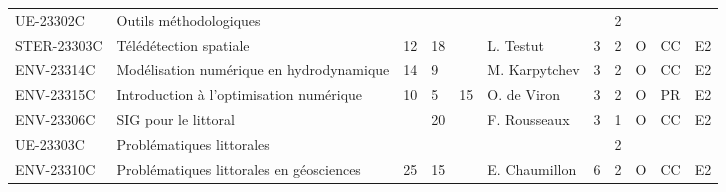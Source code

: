 \documentclass[a4paper,11pt]{article}
\begin{document}
{{\begin{tabular}{lllllllllll}
\rowcolor[HTML]{C0C0C0} 
UE-23302C                      & Outils méthodologiques                        &                           &                           &                           &                                    &                             & 2                           &                                    &                                  &                                  \\
STER-23303C                    & Télédétection spatiale                        & 12                        & 18                        &                           & L. Testut                          & 3                           & 2                           & O                                  & CC                               & E2                               \\
ENV-23314C                     & Modélisation numérique en hydrodynamique      & 14                        & 9                         &                           & M. Karpytchev                      & 3                           & 2                           & O                                  & CC                               & E2                               \\
ENV-23315C                     & Introduction à l'optimisation numérique       & 10                        & 5                         & 15                        & O. de Viron                        & 3                           & 2                           & O                                  & PR                               & E2                               \\
ENV-23306C                     & SIG pour le littoral                          &                           & 20                        &                           & F. Rousseaux                       & 3                           & 1                           & O                                  & CC                               & E2                               \\
\rowcolor[HTML]{C0C0C0} 
UE-23303C                      & Problématiques littorales                     &                           &                           &                           &                                    &                             & 2                           &                                    &                                  &                                  \\
ENV-23310C                     & Problématiques littorales en géosciences      & 25                        & 15                        &                           & E. Chaumillon                      & 6                           & 2                           & O                                  & CC                               & E2                               \\

\end{tabular}}}
\end{document}
